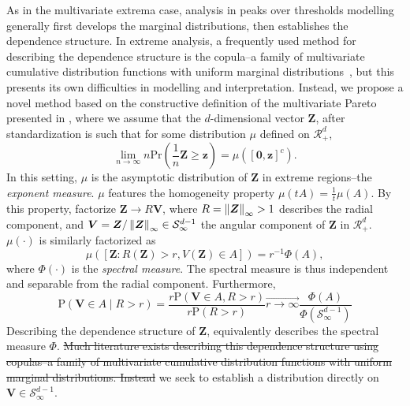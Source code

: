 As in the multivariate extrema case, analysis in peaks over thresholds modelling generally first
  develops the marginal distributions, then establishes the dependence structure.  In extreme analysis,
  a frequently used method for describing the dependence structure is the copula--a family of
  multivariate cumulative distribution functions with uniform marginal distributions~\cite{renard2007,deng2011,falk2019},
  but this presents its own difficulties in modelling and interpretation.  Instead, we propose a novel
  method based on the constructive definition of the multivariate Pareto presented in
  \cite{ferreira2014}, where we assume that the $d$-dimensional vector $\bm{Z}$, after standardization
  is such that for some distribution $\mu$ defined on $\mathcal{R}_+^d$,
  \begin{equation}
    \lim\limits_{n\to\infty}n\text{Pr}\left(\frac{1}{n}\bm{Z}\geq \bm{z}\right) = \mu\left([\bm{0},\bm{z}]^c\right).
  \end{equation}
  In this setting, $\mu$ is the asymptotic distribution of $\bm{Z}$ in extreme regions--the
  \emph{exponent measure}.  $\mu$ features the homogeneity property $\mu(tA) = \frac{1}{t}\mu(A)$.
  By this property, \cite{ferreira2014} factorize $\bm{Z}\to R\bm{V}$, where
  $R = \left\lVert \bm{Z} \right\rVert_{\infty} > 1$ describes the radial component, and
  $\bm{V} = \bm{Z}/\left\lVert \bm{Z} \right\rVert_{\infty} \in \mathcal{S}_{\infty}^{d-1}$ the angular component of
  $\bm{Z}$ in $\mathcal{R}_+^d$.  $\mu(\cdot)$ is similarly factorized as
  \begin{equation}
    \mu\left( [\bm{Z} : R(\bm{Z}) > r, V(\bm{Z}) \in A ] \right) = r^{-1}\Phi(A),
  \end{equation}
  where $\Phi(\cdot)$ is the \emph{spectral measure}.  The spectral measure is thus independent and
  separable from the radial component.  Furthermore,
  \begin{equation}
    \text{P}\left(\bm{V} \in A \mid R > r\right)
      = \frac{r\text{P}\left(\bm{V} \in A, R > r\right)}{r\text{P}(R > r)}
      \stackrel{\longrightarrow}{r\to\infty} \frac{\Phi(A)}{\Phi(\mathcal{S}_{\infty}^{d-1})}
  \end{equation}
  Describing the dependence structure of $\bm{Z}$, equivalently describes the spectral measure
  $\Phi$. \st{ Much literature exists describing this dependence structure using copulas--a family of
  multivariate cumulative distribution functions with uniform marginal distributions.
  Instead}  we seek to establish a distribution directly on $\bm{V} \in \mathcal{S}_{\infty}^{d-1}$.

